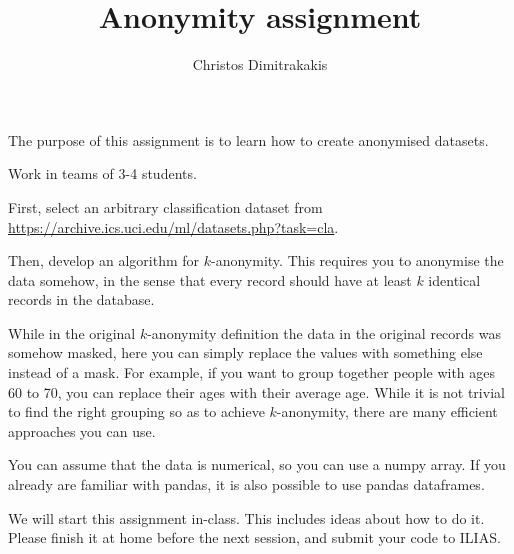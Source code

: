 \documentclass[a4paper]{article}
\title{Anonymity assignment}
\author{Christos Dimitrakakis}
\begin{document}
\maketitle
The purpose of this assignment is to learn how to create anonymised datasets.

\begin{exercise}
  Work in teams of 3-4 students.


  First, select an arbitrary classification dataset from \url{https://archive.ics.uci.edu/ml/datasets.php?task=cla}. 

  Then, develop an algorithm for $k$-anonymity. This requires you to
  anonymise the data somehow, in the sense that every record should
  have at least $k$ identical records in the database.

  While in the original $k$-anonymity definition the data in the
  original records was somehow masked, here you can simply replace the
  values with something else instead of a mask. For example, if you
  want to group together people with ages 60 to 70, you can replace
  their ages with their average age. While it is not trivial to find
  the right grouping so as to achieve $k$-anonymity, there are many
  efficient approaches you can use. 

  You can assume that the data is numerical, so you can use a numpy
  array. If you already are familiar with pandas, it is also possible
  to use pandas dataframes.

  We will start this assignment in-class. This includes ideas about
  how to do it. Please finish it at home before the next session, and
  submit your code to ILIAS.
  
\end{exercise}
\end{document}
